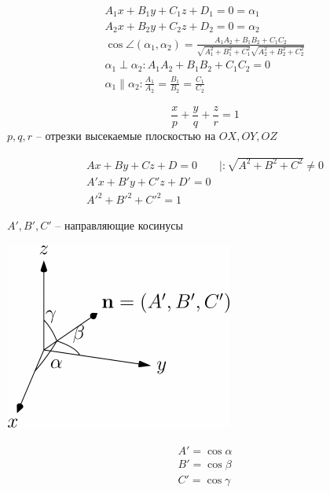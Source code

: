 \documentclass[main]{subfiles}
\begin{document}
\begin{definition}
    \begin{gather*}
        A_1x + B_1 y + C_1 z + D_1 = 0 = \alpha_1\\
        A_2x + B_2 y + C_2 z + D_2 = 0 = \alpha_2\\
        \cos\angle(\alpha_1, \alpha_2) =
        \frac{A_1 A_2 + B_1 B_2 + C_1 C_2}{\sqrt{A_1^2 + B_1^2 + C_1^2}\sqrt{A_2^2 + B_2^2 + C_2^2}}\\
        \alpha_1 \perp \alpha_2: A_1 A_2 + B_1 B_2 + C_1 C_2 = 0\\
        \alpha_1 \parallel \alpha_2: \frac{A_1}{A_2} = \frac{B_1}{B_2} = \frac{C_1}{C_2}
    \end{gather*}
\end{definition}

\begin{definition}
    \[\frac{x}{p} + \frac{y}{q} + \frac{z}{r} = 1\]
    $p,q,r$ -- отрезки высекаемые плоскостью на $OX, OY, OZ$
\end{definition}


\begin{definition}
    \begin{gather*}
        Ax + By + Cz + D = 0 \qquad |:\sqrt{A^2 + B^2 +C^2} \neq 0\\
        A'x + B'y + C'z +D' = 0\\
        A'^2 + B'^2 + C'^2 = 1
    \end{gather*}
\end{definition}

\begin{definition}
    $A', B', C'$ -- направляющие косинусы

    \noindent\begin{minipage}{.45\textwidth}
        \begin{center}
            \includegraphics{figures/directional_cosines.pdf}
        \end{center}
    \end{minipage}
    \begin{minipage}{.45\textwidth}
        \begin{gather*}
            A' = \cos \alpha\\
            B' = \cos \beta\\
            C' = \cos \gamma\\
        \end{gather*}
    \end{minipage}
\end{definition}
\end{document}
